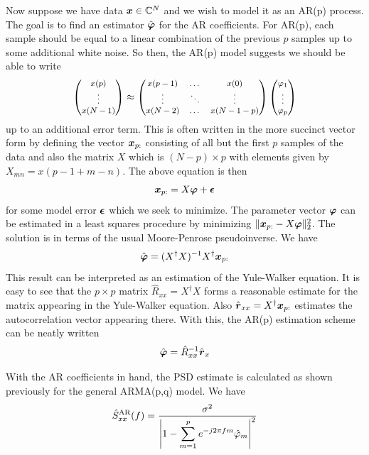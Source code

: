 \documentclass[twocolumn]{gwclass}
\newcommand{\C}{\mathbb{C}}
\begin{document}
Now suppose we have data $\*x\in\C^N$ and we wish to model it as an AR(p) process. The goal is to find an estimator $\hat{\boldsymbol{\varphi}}$ for the AR coefficients. For AR(p), each sample should be equal to a linear combination of the previous $p$ samples up to some additional white noise. So then, the AR(p) model suggests we should be able to write
$$ \footnotesize\begin{pmatrix}
	x(p)\\
	\vdots\\
	x(N-1)
\end{pmatrix} \approx
\begin{pmatrix}
	x(p-1) & \dots & x(0) \\
	\vdots & \ddots & \vdots \\
	x(N-2) & \dots & x(N-1-p)
\end{pmatrix}
\begin{pmatrix}
	\varphi_1 \\
	\vdots \\
	\varphi_p
\end{pmatrix} $$
up to an additional error term. This is often written in the more succinct vector form by defining the vector $\boldsymbol{x}_{p:}$ consisting of all but the first $p$ samples of the data and also the matrix $X$ which is $(N-p)\times p$ with elements given by $X_{mn}=x(p-1+m-n)$. The above equation is then
$$ \boldsymbol{x}_{p:} = X\boldsymbol{\varphi} + \boldsymbol{\epsilon} $$
for some model error $\boldsymbol{\epsilon}$ which we seek to minimize. The parameter vector $\boldsymbol{\varphi}$ can be estimated in a least squares procedure by minimizing $\|\boldsymbol{x}_{p:} - X\boldsymbol{\varphi}\|_2^2$. The solution is in terms of the usual Moore-Penrose pseudoinverse. We have
$$ \hat{\boldsymbol{\varphi}} = (X^\dagger X)^{-1}X^\dagger \boldsymbol{x}_{p:} $$
This result can be interpreted as an estimation of the Yule-Walker equation. It is easy to see that the $p\times p$ matrix $\hat{R}_{xx}=X^\dagger X$ forms a reasonable estimate for the matrix appearing in the Yule-Walker equation. Also $\hat{\boldsymbol{r}}_{xx}=X^\dagger \boldsymbol{x}_{p:}$ estimates the autocorrelation vector appearing there. With this, the AR(p) estimation scheme can be neatly written
$$ \hat{\boldsymbol{\varphi}} = \hat{R}_{xx}^{-1}\hat{\boldsymbol{r}}_x $$

With the AR coefficients in hand, the PSD estimate is calculated as shown previously for the general ARMA(p,q) model. We have
$$ \hat{S}_{xx}^{\text{\normalfont{AR}}}(f) = \frac{\sigma^2}{\abs{1 - \displaystyle\sum_{m=1}^p e^{-j2\pi f m}\hat{\varphi}_m}^2} $$
\end{document}
